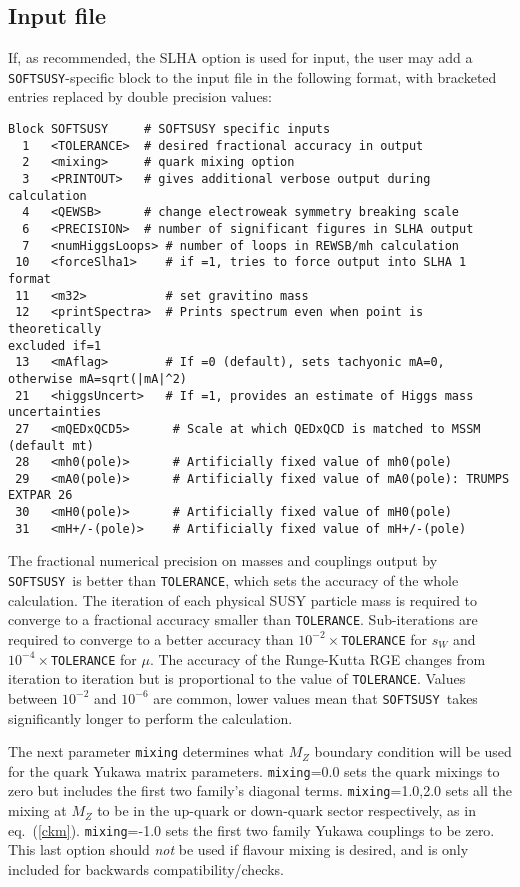 \documentclass{article}
\def\SOFTSUSY{{\tt SOFTSUSY}}
\def\code#1{\small{\tt #1}\normalsize}
\begin{document}
\subsection{Input file \label{sec:input}}

If, as recommended, the SLHA option is used for input, the user may
add
a \SOFTSUSY-specific block to the input file in the following format, with
bracketed entries replaced by double precision values:
\small
\begin{verbatim}
Block SOFTSUSY     # SOFTSUSY specific inputs
  1   <TOLERANCE>  # desired fractional accuracy in output
  2   <mixing>     # quark mixing option
  3   <PRINTOUT>   # gives additional verbose output during calculation
  4   <QEWSB>      # change electroweak symmetry breaking scale
  6   <PRECISION>  # number of significant figures in SLHA output
  7   <numHiggsLoops> # number of loops in REWSB/mh calculation
 10   <forceSlha1>    # if =1, tries to force output into SLHA 1 format
 11   <m32>           # set gravitino mass
 12   <printSpectra>  # Prints spectrum even when point is theoretically
excluded if=1
 13   <mAflag>        # If =0 (default), sets tachyonic mA=0, otherwise mA=sqrt(|mA|^2)
 21   <higgsUncert>   # If =1, provides an estimate of Higgs mass uncertainties
 27   <mQEDxQCD5>      # Scale at which QEDxQCD is matched to MSSM (default mt)
 28   <mh0(pole)>      # Artificially fixed value of mh0(pole)
 29   <mA0(pole)>      # Artificially fixed value of mA0(pole): TRUMPS EXTPAR 26
 30   <mH0(pole)>      # Artificially fixed value of mH0(pole)
 31   <mH+/-(pole)>    # Artificially fixed value of mH+/-(pole)
\end{verbatim}
\normalsize
The fractional numerical precision on masses and couplings output by \SOFTSUSY~is better than \code{TOLERANCE}, which
sets the accuracy of the whole calculation. The iteration of
each physical SUSY particle mass is required to converge to a
fractional accuracy smaller than \code{TOLERANCE}. Sub-iterations are required
to converge to a better accuracy than $10^{-2}\times$\code{TOLERANCE} for
$s_W$ and 
$10^{-4}\times$\code{TOLERANCE} for $\mu$. The accuracy of the Runge-Kutta RGE
changes from iteration to iteration but is proportional to the value of 
\code{TOLERANCE}. Values between $10^{-2}$ and $10^{-6}$ are common, lower
values  
mean that \SOFTSUSY~takes significantly longer to perform the calculation.

The next parameter
\code{mixing} determines what $M_Z$ boundary condition will be used for the
quark Yukawa matrix parameters.
\code{mixing}=0.0 sets the quark mixings to zero but includes the first two 
family's diagonal terms.
\code{mixing}=1.0,2.0 sets all the mixing at $M_Z$
to be in the up-quark or down-quark
sector respectively, as in eq.~(\ref{ckm}).
\code{mixing}=-1.0 sets the first two family Yukawa couplings to be zero. This
last option should {\em not}\/ be used if flavour mixing is desired, and is
only included for backwards compatibility/checks.
\end{document}
